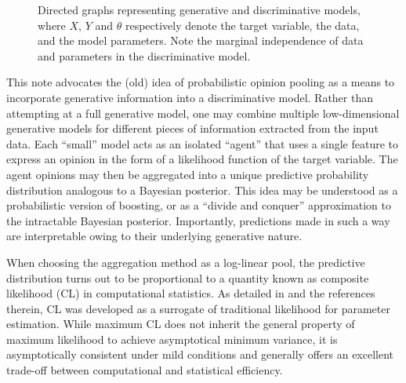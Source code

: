 \documentclass[english]{scrartcl}
\begin{document}
\begin{figure}[!ht]
\begin{center}
\hspace*{.2\textwidth}
\caption{Directed graphs representing generative and discriminative models, where $X$, $Y$ and $\theta$ respectively denote the target variable, the data, and the model parameters. Note the marginal independence of data and parameters in the discriminative model.}
\label{fig:graph_comparison}
\end{center}
\end{figure}

This note advocates the (old) idea of probabilistic opinion pooling \cite{Genest-86} as a means to incorporate generative information into a discriminative model. Rather than attempting at a full generative model, one may combine multiple low-dimensional generative models for different pieces of information extracted from the input data. Each ``small'' model acts as an isolated ``agent'' that uses a single feature to express an opinion in the form of a likelihood function of the target variable. The agent opinions may then be aggregated into a unique predictive probability distribution analogous to a Bayesian posterior. This idea may be understood as a probabilistic version of boosting, or as a ``divide and conquer'' approximation to the intractable Bayesian posterior. Importantly, predictions made in such a way are interpretable owing to their underlying generative nature.

When choosing the aggregation method as a log-linear pool, the predictive distribution turns out to be proportional to a quantity known as composite likelihood (CL) in computational statistics. As detailed in \cite{Varin-11} and the references therein, CL was developed as a surrogate of traditional likelihood for parameter estimation. While maximum CL does not inherit the general property of maximum likelihood to achieve asymptotical minimum variance, it is asymptotically consistent under mild conditions \cite{Xu-11} and generally offers an excellent trade-off between computational and statistical efficiency.
\end{document}
